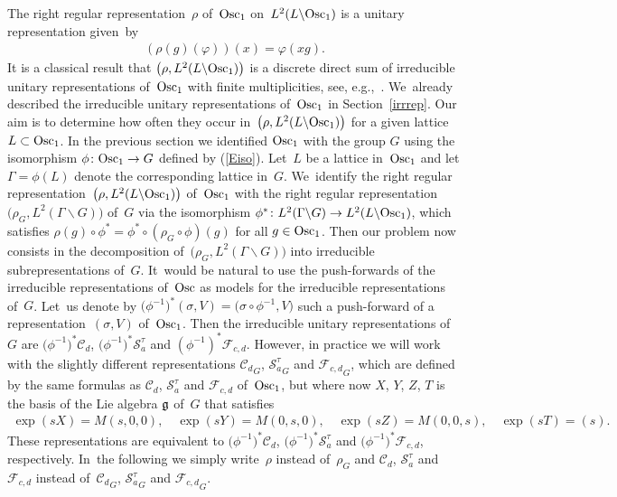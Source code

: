 \documentclass[10pt,a4paper]{amsart}
\newcommand\cC{{\mathcal C}}
\newcommand{\Osc}{{\rm Osc}}
\numberwithin{equation}{section}
\begin{document}
The right regular representation~$\rho$ of~$\Osc_1$ on~$L^2(L\backslash \Osc_1)$ is a unitary representation given~by
\begin{gather*}
(\rho(g)(\varphi))(x)=\varphi(xg).
\end{gather*}
It is a classical result that $\big(\rho,L^2(L\backslash\Osc_1)\big)$ is a discrete direct sum of irreducible unitary representations of~$\Osc_1$ with finite multiplicities, see, e.g.,~\cite{Wo07}. We~already described the irreducible unitary representations of~$\Osc_1$ in Section~\ref{irrrep}. Our aim is to determine how often they occur in~$\big(\rho,L^2(L\backslash\Osc_1)\big)$ for a given lattice $L\subset \Osc_1$.
%
In the previous section we identified $\Osc_1$ with the group $G$ using the isomorphism $\phi\colon \Osc_1\rightarrow G$ defined by (\ref{Eiso}). Let~$L$ be a lattice in~$\Osc_1$ and let $\Gamma=\phi(L)$ denote the corresponding lattice in~$G$. We~identify the right regular representation~$\big(\rho, L^2(L\backslash\Osc_1)\big)$ of~$\Osc_1$ with the right regular representation~$\big(\rho_G, L^2(\Gamma\backslash G)\big)$ of~$G$ via the isomorphism $\phi^*\colon L^2(\Gamma\backslash G)\rightarrow L^2(L\backslash\Osc_1)$, which satisfies $\rho(g)\circ\phi^*=\phi^*\circ(\rho_G\circ\phi)(g)$ for all $g\in\Osc_1$. Then our problem now consists in the decomposition of~$\big(\rho_G, L^2(\Gamma\backslash G)\big)$ into irreducible subrepresentations of~$G$. It~would be natural to use the push-forwards of the irreducible representations of~$\Osc$ as models for the irreducible representations of~$G$. Let~us denote by $\big(\phi^{-1}\big)^*(\sigma,V)=\big(\sigma\circ\phi^{-1},V\big)$ such a push-forward of a representation~$(\sigma,V)$ of~$\Osc_1$. Then the irreducible unitary representations of~$G$ are $\big(\phi^{-1}\big)^*\cC_d$, $\big(\phi^{-1}\big)^*{\mathcal S}^\tau_a$ and $(\phi^{-1})^*{\mathcal F}_{c,d}$. However, in practice we will work with the slightly different representations ${\cC_d}_G$, ${{\mathcal S}^\tau_a}_G$ and ${{\mathcal F}_{c,d}}_G$, which are defined by the same formulas as $\cC_d$, ${\mathcal S}^\tau_a$ and ${\mathcal F}_{c,d}$ of~$\Osc_1$, but where now $X$, $Y$, $Z$, $T$ is the basis of the Lie algebra $\frak g$ of~$G$ that satisfies
\begin{gather*}
\exp(sX)=M(s,0,0),\quad \exp(sY)=M(0,s,0),\quad \exp(sZ)=M(0,0,s) ,\quad \exp(sT)=(s).
\end{gather*}
These representations are equivalent to $\big(\phi^{-1}\big)^*\cC_d$, $\big(\phi^{-1}\big)^*{\mathcal S}^\tau_a$ and $\big(\phi^{-1}\big)^*{\mathcal F}_{c,d}$, respectively. In~the following we simply write~$\rho$ instead of~$\rho_G$ and $\cC_d$, ${\mathcal S}^\tau_a$ and ${\mathcal F}_{c,d}$ instead of~${\cC_d}_G$, ${{\mathcal S}^\tau_a}_G$ and ${{\mathcal F}_{c,d}}_G$.
\end{document}
